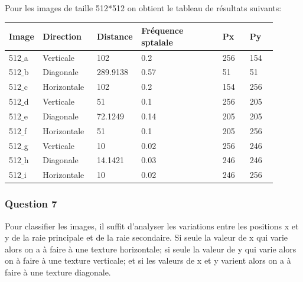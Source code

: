 \documentclass[a4paper,12pt]{report}
\begin{document}
 
Pour les images de taille 512*512 on obtient le tableau de résultats suivants:


\begin{center}
\begin{longtable}[c]{|p{0.1\linewidth}| p{0.2\linewidth}| p{0.1\linewidth}|p{0.3\linewidth}|p{0.1\linewidth}|p{0.1\linewidth}|} 

	\hline
		
	\cellcolor{gray!40}\textbf{Image}	& \cellcolor{gray!40}\textbf{Direction} & \cellcolor{gray!40}\textbf{Distance}& \cellcolor{gray!40}\textbf{Fréquence sptaiale}& \cellcolor{gray!40}\textbf{Px} & \cellcolor{gray!40}\textbf{Py} \\ \hline
	
	

512$\_$a	&Verticale		&102			&0.2					&256						&154\\ \hline
512$\_$b&	Diagonale	&	289.9138	&0.57				&51						&51\\ \hline
512$\_$c&	Horizontale&		102		&	0.2			&		154				&		256\\ \hline
512$\_$d	&Verticale	&	51			&0.1			&		256					&	205\\ \hline
512$\_$e	&Diagonale	&	72.1249		&0.14			&	205				&		205\\ \hline
512$\_$f	&Horizontale		&51			&0.1				&	205				&		256\\ \hline
512$\_$g	&Verticale		&10			&0.02			&	256				&		246\\ \hline
512$\_$h	&Diagonale		&14.1421		&0.03			&	246				&		246\\ \hline
512$\_$i	&Horizontale		&10			&0.02			&	246				&		256\\ \hline
	
\end{longtable}
\end{center}


\subsubsection*{Question 7}
Pour classifier les images, il suffit d'analyser les variations entre les positions x et y de la raie principale et de la raie secondaire. Si seule la valeur de x qui varie alors on a à faire à une texture horizontale; si seule la valeur de y qui varie alors on à faire à une texture verticale; et si les valeurs de x et y varient alors on a à faire à une texture diagonale.
\end{document}
